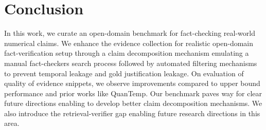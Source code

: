 \vspace{-1em}
\section{Conclusion}

In this work, we curate an open-domain benchmark for fact-checking  real-world numerical claims. We enhance the evidence collection for realistic open-domain fact-verification setup through a claim decomposition mechanism emulating a manual fact-checkers search process followed by automated filtering mechanisms to prevent temporal leakage and gold justification leakage. On evaluation of quality of evidence snippets, we observe improvements compared to upper bound performance and prior works like QuanTemp. Our benchmark paves way for clear future directions enabling to develop better claim decomposition mechanisms. We also introduce the retrieval-verifier gap enabling future research directions in this area.